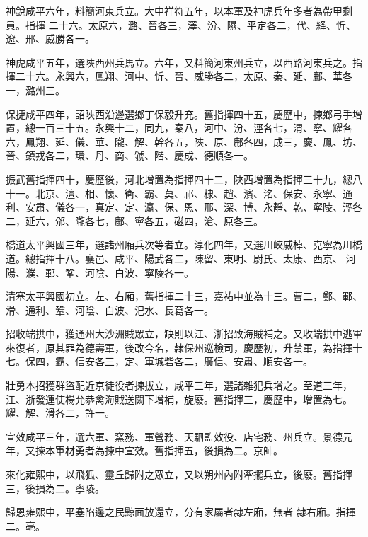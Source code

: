 \begin{pinyinscope}
 神銳咸平六年，料簡河東兵立。大中祥符五年，以本軍及神虎兵年多者為帶甲剩員。指揮
 二十六。太原六，潞、晉各三，澤、汾、隰、平定各二，代、絳、忻、遼、邢、威勝各一。



 神虎咸平五年，選陜西州兵馬立。六年，又料簡河東州兵立，以西路河東兵之。指揮二十六。永興六，鳳翔、河中、忻、晉、威勝各二，太原、秦、延、鄜、華各一，潞州三。



 保捷咸平四年，詔陜西沿邊選鄉丁保毅升充。舊指揮四十五，慶歷中，揀鄉弓手增置，總一百三十五。永興十二，同九，秦八，河中、汾、涇各七，渭、寧、耀各六，鳳翔、延、儀、華、隴、解、幹各五，陜、原、鄜各四，成三，慶、鳳、坊、晉、鎮戎各二，環、丹、商、虢、階、慶成、德順各一。



 振武舊指揮四十，慶歷後，河北增置為指揮四十二，陜西增置為指揮三十九，總八十一。北京、澶、相、懷、衛、霸、莫、祁、棣、趙、濱、洺、保安、永寧、通利、安肅、儀各一，真定、定、瀛、保、恩、邢、深、博、永靜、乾、寧陵、涇各二，延六，邠、隴各七，鄜、寧各五，磁四，滄、原各三。



 橋道太平興國三年，選諸州廂兵次等者立。淳化四年，又選川峽威棹、克寧為川橋道。總指揮十八。襄邑、咸平、陽武各二，陳留、東明、尉氏、太康、西京、
 河陽、濮、鄆、鞏、河陰、白波、寧陵各一。



 清塞太平興國初立。左、右廂，舊指揮二十三，嘉祐中並為十三。曹二，鄭、鄆、滑、通利、鞏、河陰、白波、汜水、長葛各一。



 招收端拱中，獲通州大沙洲賊眾立，缺則以江、浙招致海賊補之。又收端拱中逃軍來復者，原其罪為德壽軍，後改今名，隸保州巡檢司，慶歷初，升禁軍，為指揮十七。保四，霸、信安各三，定、軍城砦各二，廣信、安肅、順安各一。



 壯勇本招獲群盜配近京徒役者揀拔立，咸平三年，選諸雜犯兵增之。至道三年，江、浙發運使楊允恭禽海賊送闕下增補，旋廢。舊指揮三，慶歷中，增置為七。耀、解、滑各二，許一。



 宣效咸平三年，選六軍、窯務、軍營務、天駟監效役、店宅務、州兵立。景德元年，又揀本軍材勇者為揀中宣效。舊指揮五，後損為二。京師。



 來化雍熙中，以飛狐、靈丘歸附之眾立，又以朔州內附牽擺兵立，後廢。舊指揮三，後損為二。寧陵。



 歸恩雍熙中，平塞陷邊之民黥面放還立，分有家屬者隸左廂，無者
 隸右廂。指揮二。亳。




\end{pinyinscope}

